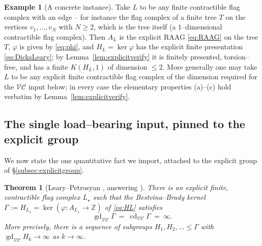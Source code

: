 \documentclass{amsart}
\newtheorem{theorem}{Theorem}
\theoremstyle{definition}
\newtheorem{example}{Example}
\newcommand{\Z}{\mathbb{Z}}
\newcommand{\VC}{\mathcal{V\!C}}
\newcommand{\gd}{\operatorname{gd}}
\newcommand{\cd}{\operatorname{cd}}
\newcommand{\AL}{A_{L}}
\newcommand{\HL}{H_{L}}
\begin{document}
\begin{example}[A concrete instance]\label{ex:concrete}
Take $L$ to be any finite contractible flag complex with an edge -- for instance the flag
complex of a finite tree $T$ on the vertices $v_1,\dots,v_N$ with $N\ge 2$, which is the tree
itself (a $1$--dimensional contractible flag complex). Then $\AL$ is the
explicit RAAG \eqref{eq:RAAG} on the tree $T$, $\varphi$ is given by \eqref{eq:phi}, and
$\HL=\ker\varphi$ has the explicit finite presentation \eqref{eq:DicksLeary}; by
Lemma~\ref{lem:explicitverify} it is finitely presented, torsion--free, and has a finite
$K(\HL,1)$ of dimension $\le 2$. More generally one may take $L$ to be any explicit finite
contractible flag complex of the dimension required for the $\VC$ input below; in every case
the elementary properties (a)--(c) hold verbatim by Lemma~\ref{lem:explicitverify}.
\end{example}

\subsection{The single load--bearing input, pinned to the explicit group}

We now state the one quantitative fact we import, attached to the explicit group of
\S\ref{subsec:explicitgroup}.

\begin{theorem}[Leary--Petrosyan {\cite[Theorem~B and \S\S2--5]{LearyPetrosyan}}, answering
{\cite{JPL}}]\label{thm:LP}
There is an explicit finite, contractible flag complex $L_\star$ such that the Bestvina--Brady
kernel $\Gamma:=H_{L_\star}=\ker(\varphi:A_{L_\star}\to\Z)$ of \eqref{eq:HL} satisfies
\[
\gd_{\VC}\Gamma\ =\ \cd_{\VC}\Gamma\ =\ \infty .
\]
More precisely, there is a sequence of subgroups $H_1,H_2,\dots\le\Gamma$ with
$\gd_{\VC}H_k\to\infty$ as $k\to\infty$.
\end{theorem}
\end{document}

